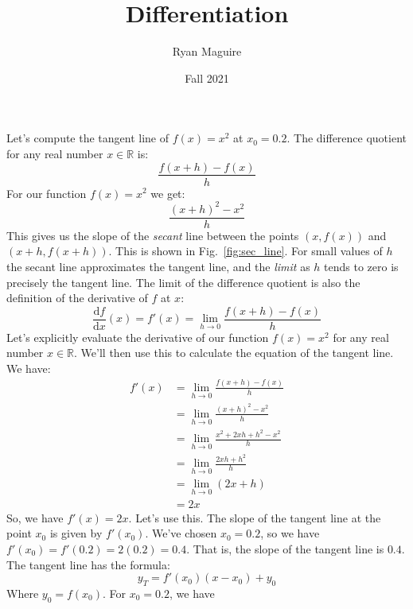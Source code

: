 \documentclass{article}
\title{Differentiation}
\author{Ryan Maguire}
\date{Fall 2021}
\theoremstyle{normal}
\begin{document}
    \maketitle
    Let's compute the tangent line of $f(x)=x^{2}$ at $x_{0}=0.2$. The
    difference quotient for any real number $x\in\mathbb{R}$ is:
    \begin{equation}
        \frac{f(x+h)-f(x)}{h}
    \end{equation}
    For our function $f(x)=x^{2}$ we get:
    \begin{equation}
        \frac{(x+h)^{2}-x^{2}}{h}
    \end{equation}
    This gives us the slope of the \textit{secant} line between the points
    $(x,f(x))$ and $(x+h,f(x+h))$. This is shown in Fig.~\ref{fig:sec_line}.
    For small values of $h$ the secant line
    approximates the tangent line, and the \textit{limit} as $h$ tends to zero
    is precisely the tangent line. The limit of the difference quotient is also
    the definition of the derivative of $f$ at $x$:
    \begin{equation}
        \frac{\textrm{d}f}{\textrm{d}x}(x)
            =f'(x)
            =\lim_{h\rightarrow{0}}\frac{f(x+h)-f(x)}{h}
    \end{equation}
    Let's explicitly evaluate the derivative of our function $f(x)=x^{2}$ for
    any real number $x\in\mathbb{R}$. We'll then use this to calculate the
    equation of the tangent line. We have:
    \begin{align}
        f'(x)&=\lim_{h\rightarrow{0}}\frac{f(x+h)-f(x)}{h}\\
            &=\lim_{h\rightarrow{0}}\frac{(x+h)^{2}-x^{2}}{h}\\
            &=\lim_{h\rightarrow{0}}\frac{x^{2}+2xh+h^{2}-x^{2}}{h}\\
            &=\lim_{h\rightarrow{0}}\frac{2xh+h^{2}}{h}\\
            &=\lim_{h\rightarrow{0}}(2x+h)\\
            &=2x
    \end{align}
    So, we have $f'(x)=2x$. Let's use this. The slope of the tangent line
    at the point $x_{0}$ is given by $f'(x_{0})$. We've chosen $x_{0}=0.2$, so
    we have $f'(x_{0})=f'(0.2)=2(0.2)=0.4$. That is, the slope of the tangent
    line is $0.4$. The tangent line has the formula:
    \begin{equation}
        y_{T}=f'(x_{0})(x-x_{0})+y_{0}
    \end{equation}
    Where $y_{0}=f(x_{0})$. For $x_{0}=0.2$, we have
\end{document}
